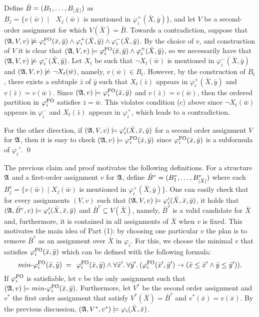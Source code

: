 	Define $\bar{B} = (B_1,\ldots,B_{\vert \bar{X} \vert})$ as $B_j = \{v(\bar{w})\mid \text{ $X_j(\bar{w})$ is mentioned in $\varphi^{+}_i(\bar{X},\bar{y})$}\}$, and let $V$ be a second-order assignment for which $V(\bar{X}) = \bar{B}$.
	Towards a contradiction, suppose that $(\mathfrak{A},V,v)\not\models \varphi^{{\rm FO}}_i(\bar{x},\bar{y}) \wedge \varphi^{+}_i(\bar{X}, \bar{y}) \wedge \varphi^{-}_i(\bar{X},\bar{y})$.
	By the choice of $v$, and construction of $V$ it is clear that $(\mathfrak{A},V,v)\models\varphi^{{\rm FO}}_i(\bar{x},\bar{y})\wedge\varphi^{+}_i(\bar{X},\bar{y})$, so we necessarily have that $(\mathfrak{A},V,v)\not\models\varphi^{-}_i(\bar{X},\bar{y})$.
	Let $X_t$ be such that $\neg X_t(\bar{w})$ is mentioned in $\varphi^{-}_i(\bar{X},\bar{y})$ and $(\mathfrak{A},V, v)\not\models\neg X_t(\bar{w})$, namely, $v(\bar{w})\in B_t$. 
	However, by the construction of $B_t$, there exists a subtuple $\bar{z}$ of $\bar{y}$ such that $X_t(\bar{z})$ appears in $\varphi^{+}_i(\bar{X},\bar{y})$ and $v(\bar{z}) = v(\bar{w})$. Since $(\mathfrak{A},v)\models\varphi^{{\rm FO}}_i(\bar{x},\bar{y})$ and $v(\bar{z}) = v(\bar{w})$, then the ordered partition in $\varphi^{{\rm FO}}_i$ satisfies $\bar{z} = \bar{w}$. This violates condition (c) above since $\neg X_t(\bar{w})$ appears in $\varphi^{-}_i$ and $X_t(\bar{z})$ appears in $\varphi^{+}_i$, which leads to a contradiction. 
	
	For the other direction, if $(\mathfrak{A},V,v)\models \varphi_i'(\bar{X},\bar{x}, \bar{y})$ for a second order assignment $V$ for $\mathfrak{A}$, then it is easy to check $(\mathfrak{A},v)\models\varphi^{{\rm FO}}_i(\bar{x},\bar{y})$ since $\varphi^{{\rm FO}}_i(\bar{x},\bar{y})$ is a subformula of $\varphi_i'$.
\qed

The previous claim and proof motivates the following definitions.
For a structure $\mathfrak{A}$ and a first-order assignment $v$ for $\mathfrak{A}$, define $\bar{B}^v = (B^v_1,\ldots,B^v_{\vert \bar{X} \vert})$ where each $B^v_j = \{v(\bar{w}) \mid \text{$X_j(\bar{w})$ is mentioned in $\varphi^{+}_i(\bar{X},\bar{y})$}\}$.
One can easily check that for every assignments $(V, v)$ such that $(\mathfrak{A},V,v)\models \varphi_i'(\bar{X}, \bar{x}, \bar{y})$, it holds that $(\mathfrak{A},\bar{B}^v,v)\models \varphi_i'(\bar{X}, \bar{x}, \bar{y})$ and $\bar{B}^v \subseteq V(\bar{X})$, namely, $\bar{B}^v$ is a valid candidate for $\bar{X}$ and, furthermore, it is contained in all assignments of $\bar{X}$ when $v$ is fixed.
This motivates the main idea of Part (1): by choosing one particular $v$ the plan is to remove $\bar{B}^v$ as an assignment over $\bar{X}$ in $\varphi_i$. 
For this, we choose the minimal $v$ that satisfies $\varphi^{{\rm FO}}_i(\bar{x},\bar{y})$ which can be defined with the following formula:
\[
\text{$min$-}\varphi^{{\rm FO}}_i(\bar{x}, \bar{y}) \; = \;  \,\varphi_i^{{\rm FO}}(\bar{x},\bar{y})\wedge \forall{\bar{x}'}.\: \forall{\bar{y}'}.\:(\varphi_i^{{\rm FO}}(\bar{x}',\bar{y}')\to ( \bar{x}\leq\bar{x}' \wedge  \bar{y}\leq\bar{y}')).
\] 
If $\varphi^{{\rm FO}}_i$ is satisfiable, let $v$ be the only assignment such that  $(\mathfrak{A},v)\models \text{$min$-}\varphi^{{\rm FO}}_i(\bar{x}, \bar{y})$. 
Furthermore, let $V^*$ be the second order assignment and $v^*$ the first order assignment that satisfy $V^*(\bar{X}) = \bar{B}^{v}$ and $v^*(\bar{x}) = v(\bar{x})$.
By the previous discussion, $(\mathfrak{A},V^*,v^*)\models\varphi_i(\bar{X},\bar{x})$.

